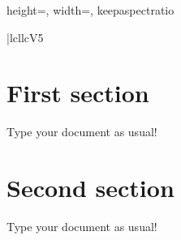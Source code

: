 \documentclass[12pt]{article}
\begin{document}
\begin{table}[ht!]
\begin{adjustbox}{height=\textheight, width=\textwidth, keepaspectratio}
\begin{tabular}{|lcllcV{5}}
                                                                                                              \\ 
\end{tabular}
\end{adjustbox}
\end{table}
\newpage
\section{First section}
Type your document as usual!
\newpage
\section{Second section}
Type your document as usual!
\end{document}
